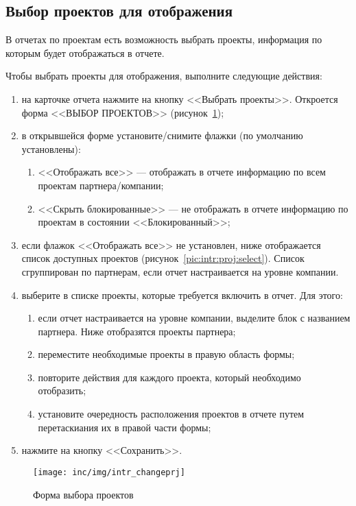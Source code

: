 

\subsection{Выбор проектов для отображения}
\label{subsec:выбор-проектов-для-отображения}

В отчетах по проектам есть возможность выбрать проекты, информация по которым будет отображаться в отчете.

Чтобы выбрать проекты для отображения, выполните следующие действия:
\begin{enumerate}
    \item на карточке отчета нажмите на кнопку <<Выбрать проекты>>. Откроется форма <<ВЫБОР ПРОЕКТОВ>> (рисунок~\ref{pic:changeprj});
    \item в открывшейся форме установите/снимите флажки (по умолчанию установлены):
    \begin{enumerate}
        \item <<Отображать все>> --- отображать в отчете информацию по всем проектам партнера/компании;
        \item <<Скрыть блокированные>> --- не отображать в отчете информацию по проектам в состоянии <<Блокированный>>;
    \end{enumerate}
    \item если флажок <<Отображать все>> не установлен, ниже отображается список доступных проектов (рисунок~\ref{pic:intr:proj:select}). Список сгруппирован по партнерам, если отчет настраивается на уровне компании.
    \item выберите в списке проекты, которые требуется включить в отчет. Для этого:
    \begin{enumerate}
        \item если отчет настраивается на уровне компании, выделите блок с названием партнера. Ниже отобразятся проекты партнера;
        \item переместите необходимые проекты в правую область формы;
        \item повторите действия для каждого проекта, который необходимо отобразить;
        \item установите очередность расположения проектов в отчете путем перетаскиания их в правой части формы;
    \end{enumerate}
    \item нажмите на кнопку <<Сохранить>>.
\end{enumerate}

\begin{figure}[ht]
    \centering
    \texttt{[image: inc/img/intr\_changeprj]}
    \caption{Форма выбора проектов}
    \label{pic:changeprj}
\end{figure}

